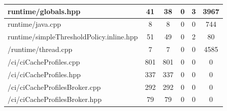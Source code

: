\begin{table}[ht!]
\begin{center}
\begin{tabular}{|l|c|c|c|c|c|}
      runtime/globals.hpp & 41 & 38 & 0 & 3 & 3967 \\ \hline
      runtime/java.cpp & 8 & 8 & 0 & 0 & 744 \\ \hline
      runtime/simpleThresholdPolicy.inline.hpp & 51 & 49 & 0 & 2 & 80 \\ \hline
      /runtime/thread.cpp & 7 & 7 & 0 & 0 & 4585 \\ \hline  
      /ci/ciCacheProfiles.cpp & 801 & 801 & 0 & 0 & 0 \\ \hline  
      /ci/ciCacheProfiles.hpp & 337 & 337 & 0 & 0 & 0 \\ \hline 
      /ci/ciCacheProfilesBroker.cpp & 292 & 292 & 0 & 0 & 0 \\ \hline 
      /ci/ciCacheProfilesBroker.hpp & 79 & 79 & 0 & 0 & 0 \\ \hline 
    \end{tabular}
  \end{center}
\end{table}
